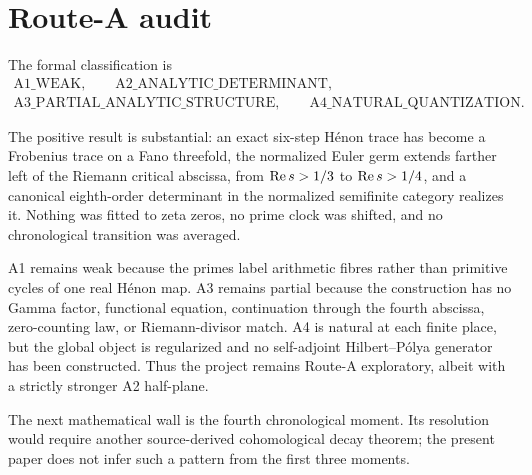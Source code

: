 \section{Route-A audit}

The formal classification is
\[
\begin{gathered}
 \mathrm{A1\_WEAK},\qquad
 \mathrm{A2\_ANALYTIC\_DETERMINANT},\\
 \mathrm{A3\_PARTIAL\_ANALYTIC\_STRUCTURE},\qquad
 \mathrm{A4\_NATURAL\_QUANTIZATION}.
\end{gathered}
\]

The positive result is substantial: an exact six-step H\'enon trace has
become a Frobenius trace on a Fano threefold, the normalized Euler germ
extends farther left of the Riemann critical abscissa, from
\(\operatorname{Re} s>1/3\) to \(\operatorname{Re} s>1/4\), and a
canonical eighth-order determinant in the normalized semifinite category
realizes it.  Nothing was fitted to zeta zeros, no prime clock was shifted,
and no chronological transition was averaged.

A1 remains weak because the primes label arithmetic fibres rather than
primitive cycles of one real H\'enon map.  A3 remains partial because the
construction has no Gamma factor, functional equation, continuation through
the fourth abscissa, zero-counting law, or Riemann-divisor match.  A4 is
natural at each finite place, but the global object is regularized and no
self-adjoint Hilbert--P\'olya generator has been constructed.  Thus the
project remains Route-A exploratory, albeit with a strictly stronger A2
half-plane.

The next mathematical wall is the fourth chronological moment.  Its
resolution would require another source-derived cohomological decay theorem;
the present paper does not infer such a pattern from the first three moments.
